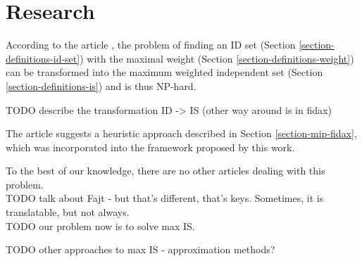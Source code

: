 \chapter{Research}

According to the article \cite[Chapter~4]{fidax}, the problem of finding an ID set (Section \ref{section-definitions-id-set}) with the maximal weight (Section \ref{section-definitions-weight}) can be transformed into the maximum weighted independent set (Section \ref{section-definitions-is}) and is thus NP-hard. 

TODO describe the transformation ID -> IS (other way around is in fidax)

The article suggests a heuristic approach described in Section \ref{section-mip-fidax}, which was incorporated into the framework proposed by this work.

To the best of our knowledge, there are no other articles dealing with this problem.\\

TODO talk about Fajt \cite{fajt} - but that's different, that's keys. Sometimes, it is translatable, but not always.\\

TODO our problem now is to solve max IS.

TODO other approaches to max IS - approximation methods?